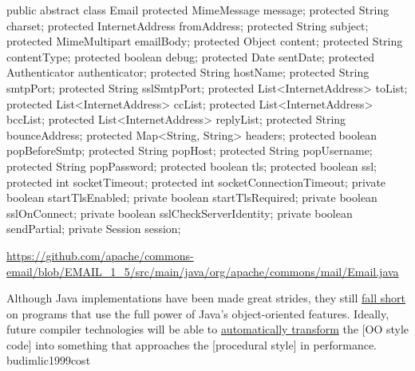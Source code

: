 \documentclass{article}
\begin{document}

\begin{pptWide}{2}
{\scriptsize\begin{ffcode}
public abstract class Email {
  protected MimeMessage message;
  protected String charset;
  protected InternetAddress fromAddress;
  protected String subject;
  protected MimeMultipart emailBody;
  protected Object content;
  protected String contentType;
  protected boolean debug;
  protected Date sentDate;
  protected Authenticator authenticator;
  protected String hostName;
  protected String smtpPort;
  protected String sslSmtpPort;
  protected List<InternetAddress> toList;
  protected List<InternetAddress> ccList;
  protected List<InternetAddress> bccList;
  protected List<InternetAddress> replyList;
  protected String bounceAddress;
  protected Map<String, String> headers;
  protected boolean popBeforeSmtp;
  protected String popHost;
  protected String popUsername;
  protected String popPassword;
  protected boolean tls;
  protected boolean ssl;
  protected int socketTimeout;
  protected int socketConnectionTimeout;
  private boolean startTlsEnabled;
  private boolean startTlsRequired;
  private boolean sslOnConnect;
  private boolean sslCheckServerIdentity;
  private boolean sendPartial;
  private Session session;
}
\end{ffcode}
}
\end{pptWide}
\par
{\tiny\url{https://github.com/apache/commons-email/blob/EMAIL_1_5/src/main/java/org/apache/commons/mail/Email.java}\par}
\plush{}


  {Although Java implementations have been made great strides, they still \ul{fall short} on programs that use the full power of Java's object-oriented features. Ideally, future compiler technologies will be able to \ul{automatically transform} the [OO style code] into something that approaches the [procedural style] in performance.}
  {budimlic1999cost}
\end{document}
